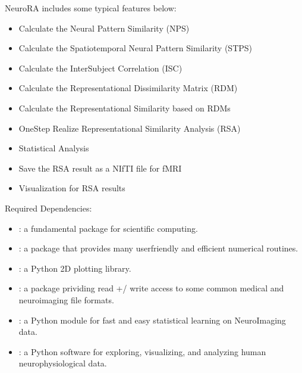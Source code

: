 \documentclass[letterpaper,10pt,english]{sphinxhowto}
\begin{document}
\sphinxAtStartPar
NeuroRA includes some typical features below:
\begin{itemize}
\item {} 
\sphinxAtStartPar
Calculate the Neural Pattern Similarity (NPS)

\item {} 
\sphinxAtStartPar
Calculate the Spatiotemporal Neural Pattern Similarity (STPS)

\item {} 
\sphinxAtStartPar
Calculate the Inter\sphinxhyphen{}Subject Correlation (ISC)

\item {} 
\sphinxAtStartPar
Calculate the Representational Dissimilarity Matrix (RDM)

\item {} 
\sphinxAtStartPar
Calculate the Representational Similarity based on RDMs

\item {} 
\sphinxAtStartPar
One\sphinxhyphen{}Step Realize Representational Similarity Analysis (RSA)

\item {} 
\sphinxAtStartPar
Statistical Analysis

\item {} 
\sphinxAtStartPar
Save the RSA result as a NIfTI file for fMRI

\item {} 
\sphinxAtStartPar
Visualization for RSA results

\end{itemize}

\sphinxAtStartPar
Required Dependencies:
\begin{itemize}
\item {} 
\sphinxAtStartPar
{}: a fundamental package for scientific computing.

\item {} 
\sphinxAtStartPar
{}: a package that provides many user\sphinxhyphen{}friendly and efficient numerical routines.

\item {} 
\sphinxAtStartPar
{}: a Python 2D plotting library.

\item {} 
\sphinxAtStartPar
{}: a package prividing read +/\sphinxhyphen{} write access to some common medical and neuroimaging file formats.

\item {} 
\sphinxAtStartPar
{}: a Python module for fast and easy statistical learning on NeuroImaging data.

\item {} 
\sphinxAtStartPar
{}: a Python software for exploring, visualizing, and analyzing human neurophysiological data.

\end{itemize}
\end{document}
